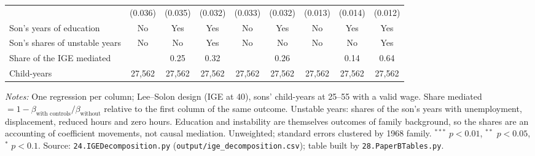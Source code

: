 \begin{table}[!htbp]
{{\begin{tabular}{lcccccccc}
 & (0.036) & (0.035) & (0.032) & (0.033) & (0.032) & (0.013) & (0.014) & (0.012) \\
Son's years of education & No & Yes & Yes & No & Yes & No & Yes & Yes \\
Son's shares of unstable years & No & No & Yes & No & No & No & No & Yes \\
Share of the IGE mediated &  & 0.25 & 0.32 &  & 0.26 &  & 0.14 & 0.64 \\
Child-years & 27,562 & 27,562 & 27,562 & 27,562 & 27,562 & 27,562 & 27,562 & 27,562 \\
\bottomrule
\end{tabular}}}
\par\smallskip
\begin{minipage}{\textwidth}\footnotesize \textit{Notes:} One regression per column; Lee--Solon design (IGE at 40), sons' child-years at 25--55 with a valid wage. Share mediated $= 1 - \beta_{\text{with controls}}/\beta_{\text{without}}$ relative to the first column of the same outcome. Unstable years: shares of the son's years with unemployment, displacement, reduced hours and zero hours. Education and instability are themselves outcomes of family background, so the shares are an accounting of coefficient movements, not causal mediation. Unweighted; standard errors clustered by 1968 family. $^{***}$ $p<0.01$, $^{**}$ $p<0.05$, $^{*}$ $p<0.1$. Source: \texttt{24.IGEDecomposition.py} (\texttt{output/ige\_decomposition.csv}); table built by \texttt{28.PaperBTables.py}.\end{minipage}
\end{table}
